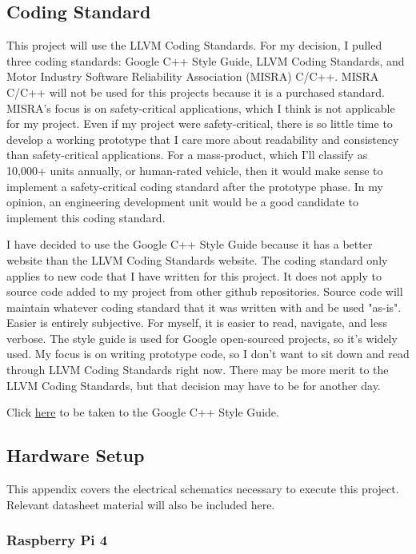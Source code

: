 \documentclass[journal]{IEEEtran}
\begin{document}
    \subsection {Coding Standard}
    This project will use the LLVM Coding Standards. 
    For my decision, I pulled three coding standards: Google C++ Style Guide, LLVM Coding Standards, and Motor Industry Software Reliability Association (MISRA) C/C++.
    MISRA C/C++ will not be used for this projects because it is a purchased standard.
    MISRA's focus is on safety-critical applications, which I think is not applicable for my project.
    Even if my project were safety-critical, there is so little time to develop a working prototype that I care more about readability and consistency than safety-critical applications.
    For a mass-product, which I'll classify as 10,000+ units annually, or human-rated vehicle, then it would make sense to implement a safety-critical coding standard after the prototype phase.
    In my opinion, an engineering development unit would be a good candidate to implement this coding standard.

    I have decided to use the Google C++ Style Guide because it has a better website than the LLVM Coding Standards website.
    The coding standard only applies to new code that I have written for this project.
    It does not apply to source code added to my project from other github repositories.
    Source code will maintain whatever coding standard that it was written with and be used "as-is".
    Easier is entirely subjective. For myself, it is easier to read, navigate, and less verbose.
    The style guide is used for Google open-sourced projects, so it's widely used.
    My focus is on writing prototype code, so I don't want to sit down and read through LLVM Coding Standards right now.
    There may be more merit to the LLVM Coding Standards, but that decision may have to be for another day.

    Click {\href{https://google.github.io/styleguide/cppguide.html}{here}} to be taken to the Google C++ Style Guide.

    \subsection{Hardware Setup}
    This appendix covers the electrical schematics necessary to execute this project.
    Relevant datasheet material will also be included here.

    \subsubsection{Raspberry Pi 4}
\end{document}
